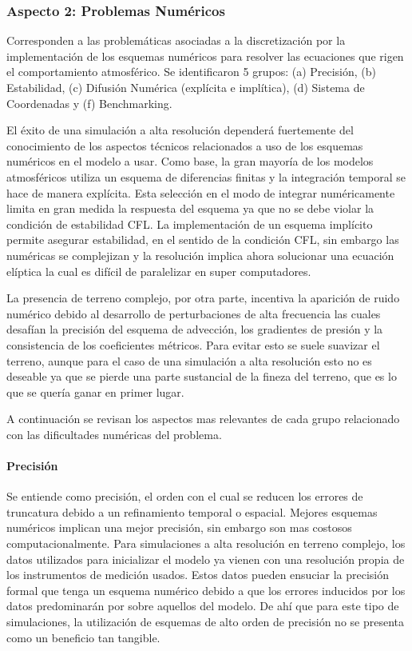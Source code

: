 \subsubsection{Aspecto 2: Problemas Numéricos}
Corresponden a las problemáticas asociadas a la discretización por la implementación de los esquemas numéricos para resolver las ecuaciones que rigen el comportamiento atmosférico. Se identificaron 5 grupos: (a) Precisión, (b) Estabilidad, (c) Difusión Numérica (explícita e implítica), (d) Sistema de Coordenadas y (f) Benchmarking.

El éxito de una simulación a alta resolución dependerá fuertemente del conocimiento de los aspectos técnicos relacionados a uso de los esquemas numéricos en el modelo a usar. Como base, la gran mayoría de los modelos atmosféricos utiliza un esquema de diferencias finitas y la integración temporal se hace de manera explícita. Esta selección en el modo de integrar numéricamente limita en gran medida la respuesta del esquema ya que no se debe violar la condición de estabilidad CFL. La implementación de un esquema implícito permite asegurar estabilidad, en el sentido de la condición CFL, sin embargo las numéricas se complejizan y la resolución implica ahora solucionar una ecuación elíptica la cual es difícil de paralelizar en super computadores.

La presencia de terreno complejo, por otra parte, incentiva la aparición de ruido numérico debido al desarrollo de perturbaciones de alta frecuencia las cuales desafían la precisión del esquema de advección, los gradientes de presión y la consistencia de los coeficientes métricos. Para evitar esto se suele suavizar el terreno, aunque para el caso de una simulación a alta resolución esto no es deseable ya que se pierde una parte sustancial de la fineza del terreno, que es lo que se quería ganar en primer lugar. 

A continuación se revisan los aspectos mas relevantes de cada grupo relacionado con las dificultades numéricas del problema.

\paragraph{Precisión} Se entiende como precisión, el orden con el cual se reducen los errores de truncatura debido a un refinamiento temporal o espacial. Mejores esquemas numéricos implican una mejor precisión, sin embargo son mas costosos computacionalmente. Para simulaciones a alta resolución en terreno complejo, los datos utilizados para inicializar el modelo ya vienen con una resolución propia de los instrumentos de medición usados. Estos datos pueden ensuciar la precisión formal que tenga un esquema numérico debido a que los errores inducidos por los datos predominarán por sobre aquellos del modelo. De ahí que para este tipo de simulaciones, la utilización de esquemas de alto orden de precisión no se presenta como un beneficio tan tangible.

